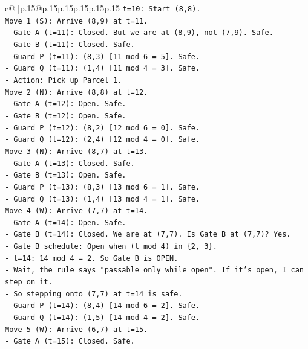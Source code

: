 \documentclass{article}
\begin{document}
{\begin{supertabular}{c@{$\;$}|p{.15\linewidth}@{}p{.15\linewidth}p{.15\linewidth}p{.15\linewidth}p{.15\linewidth}p{.15\linewidth}}
{{{\texttt{t=10: Start (8,8).} \\
\texttt{Move 1 (S): Arrive (8,9) at t=11.} \\
\texttt{{-} Gate A (t=11): Closed. But we are at (8,9), not (7,9). Safe.} \\
\texttt{{-} Gate B (t=11): Closed. Safe.} \\
\texttt{{-} Guard P (t=11): (8,3) {[}11 mod 6 = 5{]}. Safe.} \\
\texttt{{-} Guard Q (t=11): (1,4) {[}11 mod 4 = 3{]}. Safe.} \\
\texttt{{-} Action: Pick up Parcel 1.} \\
\texttt{Move 2 (N): Arrive (8,8) at t=12.} \\
\texttt{{-} Gate A (t=12): Open. Safe.} \\
\texttt{{-} Gate B (t=12): Open. Safe.} \\
\texttt{{-} Guard P (t=12): (8,2) {[}12 mod 6 = 0{]}. Safe.} \\
\texttt{{-} Guard Q (t=12): (2,4) {[}12 mod 4 = 0{]}. Safe.} \\
\texttt{Move 3 (N): Arrive (8,7) at t=13.} \\
\texttt{{-} Gate A (t=13): Closed. Safe.} \\
\texttt{{-} Gate B (t=13): Open. Safe.} \\
\texttt{{-} Guard P (t=13): (8,3) {[}13 mod 6 = 1{]}. Safe.} \\
\texttt{{-} Guard Q (t=13): (1,4) {[}13 mod 4 = 1{]}. Safe.} \\
\texttt{Move 4 (W): Arrive (7,7) at t=14.} \\
\texttt{{-} Gate A (t=14): Open. Safe.} \\
\texttt{{-} Gate B (t=14): Closed. We are at (7,7). Is Gate B at (7,7)? Yes.} \\
\texttt{{-} Gate B schedule: Open when (t mod 4) in \{2, 3\}.} \\
\texttt{{-} t=14: 14 mod 4 = 2. So Gate B is OPEN.} \\
\texttt{{-} Wait, the rule says "passable only while open". If it's open, I can step on it.} \\
\texttt{{-} So stepping onto (7,7) at t=14 is safe.} \\
\texttt{{-} Guard P (t=14): (8,4) {[}14 mod 6 = 2{]}. Safe.} \\
\texttt{{-} Guard Q (t=14): (1,5) {[}14 mod 4 = 2{]}. Safe.} \\
\texttt{Move 5 (W): Arrive (6,7) at t=15.} \\
\texttt{{-} Gate A (t=15): Closed. Safe.} \\
}}}
\end{supertabular}}
\end{document}
